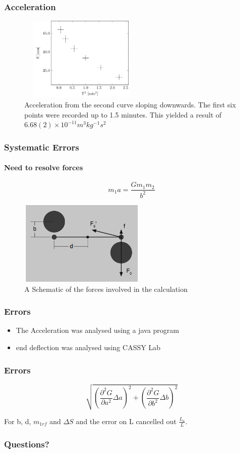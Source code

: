\documentclass{beamer}
\begin{document}
\begin{frame}
\frametitle[Gravitational Constant]{Acceleration}

\begin{figure}[H]
\centering
\includegraphics[width=6cm, height=4cm]{images/linear}
\caption{Acceleration from the second curve sloping downwards. The first six points were recorded up to 1.5 minutes. This yielded a result of $6.68(2)\times{10}^{-11} m^{3}kg^{-1}s^{2}$}
\label{fig:mainresult}
\end{figure}
\end{frame}

\begin{frame}
\frametitle[Gravitational Constant]{Systematic Errors}
  \framesubtitle{Need to resolve forces}
  $$m_{1}a=\frac{G m_{1}m_{2}}{b^{2}}$$

\begin{figure}[H]
\centering
\includegraphics[width=6cm, height=4cm]{images/Forces}
\caption{A Schematic of the forces involved in the calculation}
\label{fig:forces}
\end{figure}
\end{frame}


\begin{frame}
\frametitle[Gravitational Constant]{Errors}
\centering
\begin{itemize}
\item The Acceleration was analysed using a java program
\item end deflection was analysed using CASSY Lab
\end{itemize}

\end{frame}

\begin{frame}
\frametitle[Gravitational Constant]{Errors}
\centering
$$\sqrt{\left(\frac{\partial^{2}{G}}{\partial{}{a}^{2}}\Delta{a}\right)^{2}
+\left(\frac{\partial^{2}{G}}{\partial{b}^{2}}\Delta{b}\right)^{2}}$$

For b, d, $m_{1rf}$ and $\Delta{S}$ and the error on L cancelled out $\frac{L_{o}}{L}$.
\end{frame}


\begin{frame}
\frametitle[Gravitational Constant]{Questions?}


\end{frame}
\end{document}
